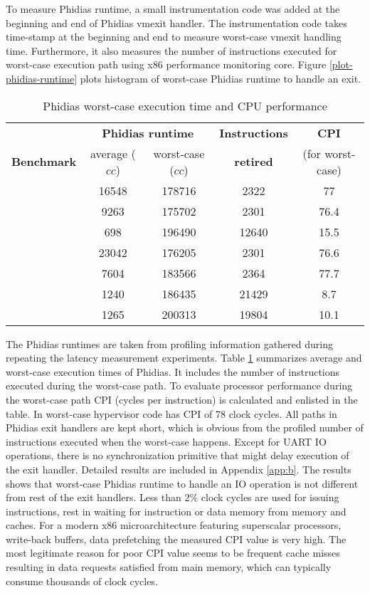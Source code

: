 To measure Phidias runtime, a small instrumentation code was added at the beginning and end of Phidias vmexit handler.
The instrumentation code takes time-stamp at the beginning and end to measure worst-case vmexit handling time.
Furthermore, it also measures the number of instructions executed for worst-case execution path using x86 performance monitoring core.
Figure \ref{plot-phidias-runtime} plots histogram of worst-case Phidias runtime to handle an exit. 



\begin{table}[!h]
\centering
\begin{tabular}{|c|c|c|c|c|}  
\hline
						& \multicolumn{2}{|c|}{\textbf{Phidias runtime}} & \textbf{Instructions}	& \textbf{CPI}\\
\textbf{Benchmark}		& average ($cc$)	&	worst-case ($cc$)	&	\textbf{retired} &	(for worst-case) \\ \hline 
\mcachepressure{}	& 16548	& 178716 & 2322 & 77\\ \hline
\mforkops{}		& 9263 & 175702 & 2301 & 76.4\\ \hline
\mfileops{}		& 698 & 196490 & 12640 & 15.5\\ \hline
\mhackbench{} 		& 23042 & 176205 & 2301 & 76.6\\ \hline
\mmmapops{} 		& 7604 & 183566 & 2364 & 77.7\\ \hline
\mstdout{} 			& 1240 & 186435 & 21429 & 8.7\\ \hline
\mthreadops{} 		& 1265 & 200313 & 19804 & 10.1\\ \hline
\end{tabular}
\caption{Phidias worst-case execution time and CPU performance} 
\label{phidias-runtime}
\end{table}

The Phidias runtimes are taken from profiling information gathered during repeating the latency measurement experiments.
Table \ref{phidias-runtime} summarizes average and worst-case execution times of Phidias. It includes the number of
instructions executed during the worst-case path. To evaluate processor performance during the worst-case path CPI (cycles per instruction)
is calculated and enlisted in the table. 
In worst-case hypervisor code has CPI of $78$ clock cycles.
All paths in Phidias exit handlers are kept short, which is obvious from the profiled number of instructions executed when the worst-case happens.
Except for UART IO operations, there is no synchronization primitive that might delay execution of the exit handler.
Detailed results are included in Appendix \ref{app:b}.
The results shows that worst-case Phidias runtime to handle an IO operation is not different from rest of the exit handlers. 
Less than $2\%$ clock cycles are used for issuing instructions, rest in waiting for instruction or data memory from memory and caches.
For a modern x86 microarchitecture featuring superscalar processors, write-back buffers, data prefetching the measured CPI value is very high.
The most legitimate reason for poor CPI value seems to be frequent cache misses resulting in data requests satisfied from main memory, which 
can typically consume thousands of clock cycles.

